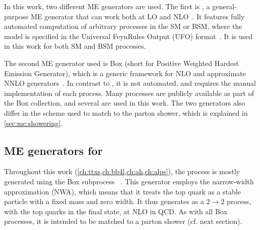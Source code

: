 In this work, two different ME generators are used. The first is \amcatnlo, a general-purpose ME generator that can work both at LO and NLO~\cite{MG5aMCatNLO:2014}. It features fully automated computation of arbitrary processes in the SM or BSM, where the model is specified in the Universal FeynRules Output (UFO) format~\cite{Degrande:2011ua}. It is used in this work for both SM and BSM processes. 

The second ME generator used is \powheg Box (short for Positive Weighted Hardest Emission Generator), which is a generic framework for NLO and approximate NNLO generators~\cite{Powheg:2004,Powheg:2007,Powheg:2010}. In contrast to \amcatnlo, it is not automated, and requires the manual implementation of each process. Many processes are publicly available as part of the \powheg Box collection, and several are used in this work. 
The two generators also differ in the scheme used to match to the parton shower, which is explained in \cref{sec:mc:showering}.

\subsection{ME generators for \ttbartitle}
\label{sec:mc:ttbar}

Throughout this work (\cref{ch:ttxs,ch:bb4l,ch:ah,ch:alps}), the \pptt process is mostly generated using the \powheg Box subprocess \hvq~\cite{Frixione:2007nw}. This generator employs the narrow-width approximation (NWA), which means that it treats the top quark as a stable particle with a fixed mass and zero width. It thus generates \pptt as a $2 \rightarrow 2$ process, with the top quarks in the final state, at NLO in QCD. As with all \powheg Box processes, it is intended to be matched to a parton shower (cf. next section). 

